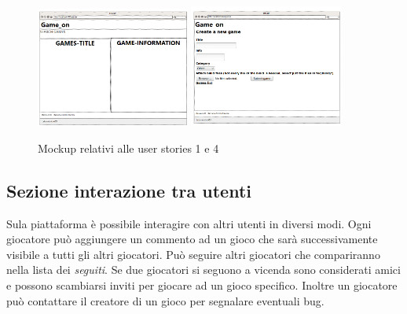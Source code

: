 \begin{figure}[h!]
  \centering
  \includegraphics[width=0.45\textwidth]{mockup_games}
  \includegraphics[width=0.45\textwidth]{mockup_add_game}
  \caption{Mockup relativi alle user stories 1 e 4}
\end{figure}

\subsection{Sezione interazione tra utenti}

Sula piattaforma è possibile interagire con altri utenti in diversi modi. Ogni giocatore può aggiungere un commento ad un gioco che sarà successivamente visibile a tutti gli altri giocatori. Può seguire altri giocatori che compariranno nella lista dei \textit{seguiti}. Se due giocatori si seguono a vicenda sono considerati amici e possono scambiarsi inviti per giocare ad un gioco specifico. Inoltre un giocatore può contattare il creatore di un gioco per segnalare eventuali bug.

